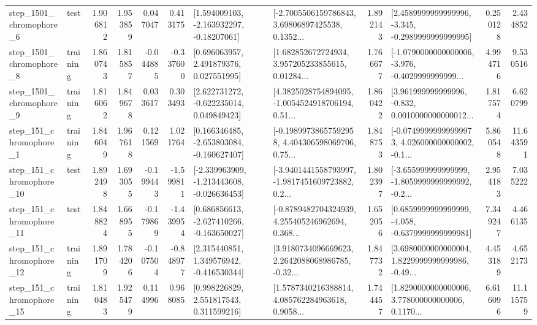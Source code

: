\begin{tabular}{llrrrrllrlrr}
  step\_1501\_chromophore\_6 &      test &      1.906812 &    1.953859 &      0.047047 &  0.413175 &    [1.594009103, -2.163932297, -0.18207061] &  [-2.7005506159786843, 3.69806897425538, 0.1352... &       1.892143 &  [2.4589999999999996, -3.345, -0.2989999999999995] &            0.250128 &          2.434852 \\
  step\_1501\_chromophore\_8 &  training &      1.860743 &    1.815857 &     -0.044885 & -0.337600 &     [0.696063957, 2.491879376, 0.027551995] &  [1.682852672724934, 3.957205233855615, 0.01284... &       1.766677 &  [-1.0790000000000006, -3.976, -0.4029999999999... &            4.994716 &          9.530516 \\
  step\_1501\_chromophore\_9 &  training &      1.816062 &    1.849678 &      0.033617 &  0.303493 &    [2.622731272, -0.622235014, 0.049849423] &  [4.3825028754894095, -1.0054524918706194, 0.51... &       1.860422 &  [3.961999999999996, -0.832, 0.0010000000000012... &            1.817574 &          6.620799 \\
   step\_151\_chromophore\_1 &  training &      1.846049 &    1.967618 &      0.121569 &  1.021764 &   [0.166346485, -2.653803084, -0.160627407] &  [-0.19899738657592958, 4.404306598069706, 0.75... &       1.848753 &  [-0.07499999999999973, 4.026000000000002, -0.1... &            5.860548 &         11.643591 \\
  step\_151\_chromophore\_10 &      test &      1.892498 &    1.693055 &     -0.199443 & -1.599811 &  [-2.339963909, -1.213443608, -0.026636453] &  [-3.9401441558793997, -1.9817451609723882, 0.2... &       1.802397 &  [-3.655999999999999, -1.8059999999999992, -0.2... &            2.954183 &          7.035222 \\
  step\_151\_chromophore\_11 &      test &      1.848824 &    1.668955 &     -0.179869 & -1.439954 &   [0.686856613, -2.627410266, -0.163650027] &  [-0.8789482704324939, 4.255405246962694, 0.368... &       1.652056 &  [0.6859999999999999, -4.058, -0.6379999999999981] &            7.349247 &          4.466135 \\
  step\_151\_chromophore\_12 &  training &      1.891709 &    1.784206 &     -0.107504 & -0.848977 &    [2.315440851, 1.349576942, -0.416530344] &  [3.9180734096669623, 2.2642088068986785, -0.32... &       1.847732 &  [3.6980000000000004, 1.8229999999999986, -0.49... &            4.453189 &          4.652173 \\
  step\_151\_chromophore\_15 &  training &      1.810483 &    1.925479 &      0.114996 &  0.968085 &     [0.998226829, 2.551817543, 0.311599216] &  [1.5787340216388814, 4.085762284963618, 0.9058... &       1.744457 &  [1.8290000000000006, 3.778000000000006, 0.1170... &            6.616096 &         11.115759 \\

\end{tabular}
